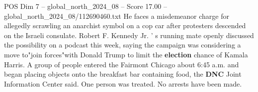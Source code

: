 \begin{textsample}{POS Dim 7 – global\_north\_2024\_08 – Score 17.00 – global\_north\_2024\_08/112690460.txt}
He faces a misdemeanor charge for allegedly scrawling an anarchist symbol on a cop car after protesters descended on the Israeli consulate.
Robert F.
Kennedy Jr. ' s running mate openly discussed the possibility on a podcast this week, saying the campaign was considering a move to"join forces"with Donald Trump to limit the \textbf{election} chance of Kamala Harris.
A group of people entered the Fairmont Chicago about 6:45 a.m. and began placing objects onto the breakfast bar containing food, the \textbf{DNC} Joint Information Center said.
One person was treated.
No arrests have been made.

\end{textsample}
